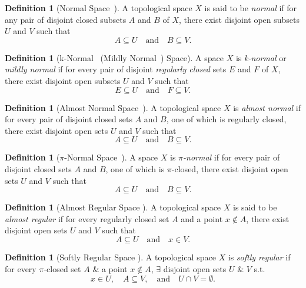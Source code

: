 \documentclass[12pt,a4paper,twoside]{report}  %
\theoremstyle{plain}
\theoremstyle{definition}
\newtheorem{definition}[theorem]{Definition}
\begin{document}
\begin{definition}[Normal Space~\cite{bourbaki1951topologie,dugundji1966topology,engelking1977general}]
A topological space $X$ is said to be \emph{normal} if for any pair of disjoint closed subsets $A$ and $B$ of $X$, there exist disjoint open subsets $U$ and $V$ such that
\[
A \subseteq U \quad \text{and} \quad B \subseteq V.
\]
\end{definition}

\begin{definition}[k-Normal~\cite{schepin1972real} (Mildly Normal~\cite{singal1973mildly}) Space]
A space $X$ is \emph{k-normal} or \emph{mildly normal} if for every pair of disjoint \emph{regularly closed} sets $E$ and $F$ of $X$, there exist disjoint open subsets $U$ and $V$ such that
\[
E \subseteq U \quad \text{and} \quad F \subseteq V.
\]
\end{definition}

\begin{definition}[Almost Normal Space~\cite{singal1969almost}]
A topological space $X$ is \emph{almost normal} if for every pair of disjoint closed sets $A$ and $B$, one of which is regularly closed, there exist disjoint open sets $U$ and $V$ such that
\[
A \subseteq U \quad \text{and} \quad B \subseteq V.
\]
\end{definition}

\begin{definition}[$\pi$-Normal Space~\cite{kalantan2008pinormal}]
A space $X$ is \emph{$\pi$-normal} if for every pair of disjoint closed sets $A$ and $B$, one of which is $\pi$-closed, there exist disjoint open sets $U$ and $V$ such that
\[
A \subseteq U \quad \text{and} \quad B \subseteq V.
\]
\end{definition}

\begin{definition}[Almost Regular Space \cite{singal1969almost}]\label{def: almost regular spaces}
A topological space $X$ is said to be \emph{almost regular} if for every regularly closed set $A$ and a point $x \notin A$, there exist disjoint open sets $U$ and $V$ such that
\[
A \subseteq U \quad \text{and} \quad x \in V.
\]
\end{definition}

\begin{definition}[Softly Regular Space \cite{kumar2018softly}]\label{softly regular}
A topological space $X$ is \emph{softly regular} if for every $\pi$-closed set $A$ $\&$ a point $x \notin A$, $\exists$ disjoint open sets $U$ $\&$ $V$ s.t.
\[
x \in U, \quad A \subseteq V, \quad \text{and} \quad U \cap V = \emptyset.
\]
\end{definition}
\end{document}
